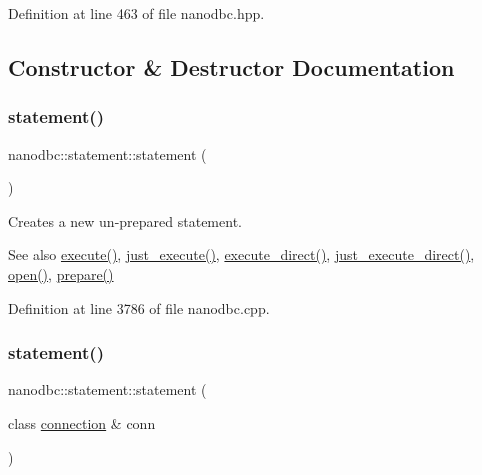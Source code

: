 Definition at line 463 of file nanodbc.\+hpp.



\subsection{Constructor \& Destructor Documentation}
\mbox{\label{classnanodbc_1_1statement_ac9ea91624b4b6136f98b002f75376cd9}} 
\subsubsection{\texorpdfstring{statement()}{statement()}\hspace{0.1cm}{\footnotesize\ttfamily [1/5]}}
{\footnotesize\ttfamily nanodbc\+::statement\+::statement (\begin{DoxyParamCaption}{ }\end{DoxyParamCaption})}



Creates a new un-\/prepared statement. 

\begin{DoxySeeAlso}{See also}
\mbox{\hyperlink{classnanodbc_1_1statement_ab30dac3e4defd5a90181202e99ee8ca5}{execute()}}, \mbox{\hyperlink{classnanodbc_1_1statement_aef172a65f45487aaeb76c45954b42b75}{just\+\_\+execute()}}, \mbox{\hyperlink{classnanodbc_1_1statement_af070dc29a840854e261bda5761318cf0}{execute\+\_\+direct()}}, \mbox{\hyperlink{classnanodbc_1_1statement_a1e18b1014feb323c346683a331df7adb}{just\+\_\+execute\+\_\+direct()}}, \mbox{\hyperlink{classnanodbc_1_1statement_a473ec2d726f6d8acc42ce0f5f6d1b967}{open()}}, \mbox{\hyperlink{classnanodbc_1_1statement_a63b56d30a303014ce8f80df5e5b67dca}{prepare()}} 
\end{DoxySeeAlso}


Definition at line 3786 of file nanodbc.\+cpp.

\mbox{\label{classnanodbc_1_1statement_aaa2dbe21f428c67d7dd32b9d8eeb8877}} 
\subsubsection{\texorpdfstring{statement()}{statement()}\hspace{0.1cm}{\footnotesize\ttfamily [2/5]}}
{\footnotesize\ttfamily nanodbc\+::statement\+::statement (\begin{DoxyParamCaption}\item[{class \mbox{\hyperlink{classnanodbc_1_1connection}{connection}} \&}]{conn }\end{DoxyParamCaption})\hspace{0.3cm}{\ttfamily [explicit]}}



